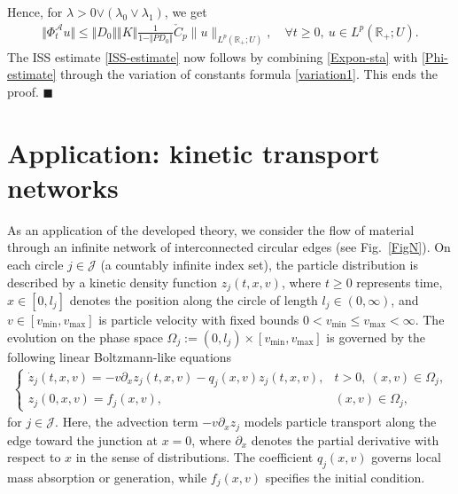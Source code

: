 \documentclass[onecolumn]{autart}
\def\R{{\mathbb{R}}}
\def\la{\lambda}
\def\calA{{\mathcal{A}}}
\def\R{\mathbb R}
\newtheorem{remark}{Remark}[section]
\numberwithin{equation}{section}
\begin{document}
		Hence, for $\la>0{\vee (\la_0 \vee \la_1)}$, we get
		\begin{align}\label{Phi-estimate}
			\Vert\Phi_t^{\calA} u\Vert
			\le  \Vert D_0\Vert \Vert K\Vert  \frac{1}{1- \Vert P D_0\Vert}
			\check{C}_p \|u\|_{L^p(\R_+; U)},\quad  \forall t \ge 0,\ u \in L^p(\R_+;U).
		\end{align}
		The ISS estimate \eqref{ISS-estimate} now follows by combining \eqref{Expon-sta} with \eqref{Phi-estimate} through the variation of constants formula \eqref{variation1}. This ends the proof. \hfill $\blacksquare$\par

	
%	
	
	\section{Application:  kinetic transport networks}\label{Sec:4}%
	As an application of the developed theory, we consider the flow of material through an infinite network of interconnected circular edges (see Fig.~\ref{FigN}).
 On each circle $j\in \mathcal{J}$ (a countably infinite index set), the particle distribution is described by a kinetic density function $z_j(t,x,v)$, where $t \ge 0$ represents time, $x \in [0, l_j]$ denotes the position along the circle of length $l_j\in (0,\infty)$, and $v \in [v_{\min}, v_{\max}]$ is particle velocity with fixed bounds $0 < v_{\min} \le v_{\max} < \infty$.
		The evolution on the phase space $\Omega_j := (0, l_j) \times [v_{\min}, v_{\max}]$ is governed by the following linear  Boltzmann-like  equations
	\begin{align}\label{Eqt1}
		\begin{cases}
			\dot{z}_{j}(t,x,v) = -v\partial_xz_{j}(t,x,v)-q_{j}(x,v)z_{j}(t,x,v), & t> 0,\ (x,v)\in \Omega_j,\\
			z_{j}(0,x,v) = f_{j}(x,v), & (x,v)\in \Omega_j,
		\end{cases}
	\end{align}
	for $j\in \mathcal{J}$. Here, the advection term $-v\partial_x z_j$ models particle transport along the edge toward the junction at $x = 0$, {where $\partial_x$ denotes the partial derivative with respect to $x$ in the sense of distributions}. The coefficient $q_j(x, v)$ governs local mass absorption or generation, while $f_j(x,v)$ specifies the initial condition.
	
\end{document}
